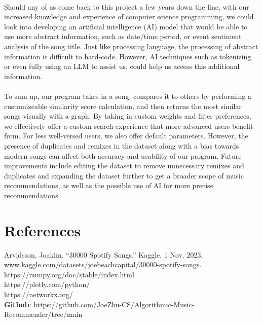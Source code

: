 \documentclass[fontsize=11pt]{article}
\begin{document}
\\
Should any of us come back to this project a few years down the line, with our increased knowledge and experience of computer science programming, we could look into developing an artificial intelligence (AI) model that would be able to use more abstract information, such as date/time period, or event sentiment analysis of the song title. Just like processing language, the processing of abstract information is difficult to hard-code. However, AI techniques such as tokenizing or even fully using an LLM to assist us, could help us access this additional information.\\
\\
To sum up, our program takes in a song, compares it to others by performing a customizeable similarity score calculation, and then returns the most similar songs visually with a graph. By taking in custom weights and filter preferences, we effectively offer a custom search experience that more advanced users benefit from. For less well-versed users, we also offer default parameters. However, the presence of duplicates and remixes in the dataset along with a bias towards modern songs can affect both accuracy and usability of our program. Future improvements include editing the dataset to remove unnecessary remixes and duplicates and expanding the dataset further to get a broader scope of music recommendations, as well as the possible use of AI for more precise recommendations.

\section*{References}

Arvidsson, Joakim. “30000 Spotify Songs.” Kaggle, 1 Nov. 2023, www.kaggle.com/datasets/joebeachcapital/30000-spotify-songs.
\\ https://numpy.org/doc/stable/index.html
\\ https://plotly.com/python/
\\ https://networkx.org/
\\ \textbf{Github}: https://github.com/JoeZhu-CS/Algorithmic-Music-Recommender/tree/main
\end{document}
